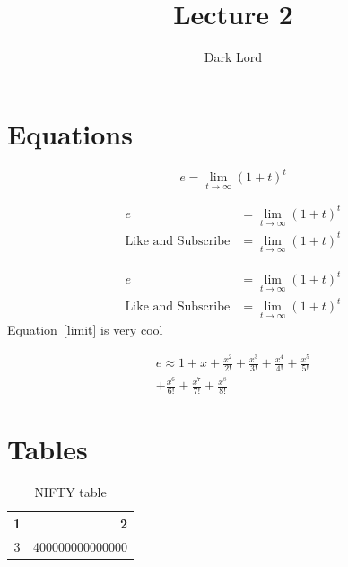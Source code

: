 \documentclass{article}
\title{Lecture 2}
\author{Dark Lord}
\begin{document}
\maketitle

\section*{Equations}


\begin{equation}
    \label{limit}
    e = \lim_{t \to \infty} {\left( 1+t \right)}^t
\end{equation}


\begin{align}
    e  &= \lim_{t \to \infty} {\left( 1+t \right)}^t\\
    \text{Like and Subscribe} &= \lim_{t \to \infty} {\left( 1+t \right)}^t
\end{align}

\begin{equation}
\begin{split}
    e &= \lim_{t \to \infty} {\left( 1+t \right)}^t \\
    \text{Like and Subscribe} &= \lim_{t \to \infty} {\left( 1+t \right)}^t
\end{split}
\end{equation}
Equation~\ref{limit} is very cool



\begin{multline}
    e \approx 1+x+ \frac{x^2}{2!}+ \frac{x^3}{3!} + \frac{x^4}{4!} + \frac{x^5}{5!}\\    
    +\frac{x^6}{6!} + \frac{x^7}{7!} + \frac{x^8}{8!}
\end{multline}


\newpage

\section{Tables}



\begin{table}
\caption{NIFTY table}\label{niftytable}
\begin{center}
    \begin{tabular}{|c|r|}
        \hline
        1 & 2 \\ \hline
        3 & 400000000000000 \\ \hline
    \end{tabular}
\end{center}
\end{table}
\end{document}
